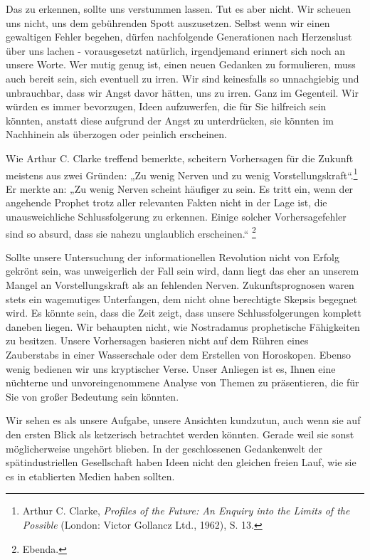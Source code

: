 \documentclass[
  a5paper,
  smalldemyvopaper,10pt,twoside,onecolumn,openright,extrafontsizes,hidelinks]{memoir}
\begin{document}
Das zu erkennen, sollte uns verstummen lassen. Tut es aber nicht. Wir
scheuen uns nicht, uns dem gebührenden Spott auszusetzen. Selbst wenn
wir einen gewaltigen Fehler begehen, dürfen nachfolgende Generationen
nach Herzenslust über uns lachen - vorausgesetzt natürlich, irgendjemand
erinnert sich noch an unsere Worte. Wer mutig genug ist, einen neuen
Gedanken zu formulieren, muss auch bereit sein, sich eventuell zu irren.
Wir sind keinesfalls so unnachgiebig und unbrauchbar, dass wir Angst
davor hätten, uns zu irren. Ganz im Gegenteil. Wir würden es immer
bevorzugen, Ideen aufzuwerfen, die für Sie hilfreich sein könnten,
anstatt diese aufgrund der Angst zu unterdrücken, sie könnten im
Nachhinein als überzogen oder peinlich erscheinen.

Wie Arthur C. Clarke treffend bemerkte, scheitern Vorhersagen für die
Zukunft meistens aus zwei Gründen: „Zu wenig Nerven und zu wenig
Vorstellungskraft``.\footnote{Arthur C. Clarke, \emph{Profiles of the
  Future: An Enquiry into the Limits of the Possible} (London: Victor
  Gollancz Ltd., 1962), S. 13.} Er merkte an: „Zu wenig Nerven scheint
häufiger zu sein. Es tritt ein, wenn der angehende Prophet trotz aller
relevanten Fakten nicht in der Lage ist, die unausweichliche
Schlussfolgerung zu erkennen. Einige solcher Vorhersagefehler sind so
absurd, dass sie nahezu unglaublich erscheinen.`` \footnote{Ebenda.}

Sollte unsere Untersuchung der informationellen Revolution nicht von
Erfolg gekrönt sein, was unweigerlich der Fall sein wird, dann liegt das
eher an unserem Mangel an Vorstellungskraft als an fehlenden Nerven.
Zukunftsprognosen waren stets ein wagemutiges Unterfangen, dem nicht
ohne berechtigte Skepsis begegnet wird. Es könnte sein, dass die Zeit
zeigt, dass unsere Schlussfolgerungen komplett daneben liegen. Wir
behaupten nicht, wie Nostradamus prophetische Fähigkeiten zu besitzen.
Unsere Vorhersagen basieren nicht auf dem Rühren eines Zauberstabs in
einer Wasserschale oder dem Erstellen von Horoskopen. Ebenso wenig
bedienen wir uns kryptischer Verse. Unser Anliegen ist es, Ihnen eine
nüchterne und unvoreingenommene Analyse von Themen zu präsentieren, die
für Sie von großer Bedeutung sein könnten.

Wir sehen es als unsere Aufgabe, unsere Ansichten kundzutun, auch wenn
sie auf den ersten Blick als ketzerisch betrachtet werden könnten.
Gerade weil sie sonst möglicherweise ungehört blieben. In der
geschlossenen Gedankenwelt der spätindustriellen Gesellschaft haben
Ideen nicht den gleichen freien Lauf, wie sie es in etablierten Medien
haben sollten.
\end{document}

